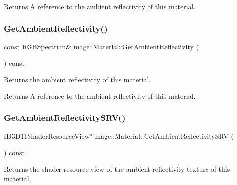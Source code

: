 \begin{DoxyReturn}{Returns}
A reference to the ambient reflectivity of this material. 
\end{DoxyReturn}
\hypertarget{structmage_1_1_material_ad13afcccbb9b73cddd23a8586e77136e}{}\label{structmage_1_1_material_ad13afcccbb9b73cddd23a8586e77136e} 
\subsubsection{\texorpdfstring{Get\+Ambient\+Reflectivity()}{GetAmbientReflectivity()}\hspace{0.1cm}{\footnotesize\ttfamily [2/2]}}
{\footnotesize\ttfamily const \hyperlink{structmage_1_1_r_g_b_spectrum}{R\+G\+B\+Spectrum}\& mage\+::\+Material\+::\+Get\+Ambient\+Reflectivity (\begin{DoxyParamCaption}{ }\end{DoxyParamCaption}) const\hspace{0.3cm}{\ttfamily [noexcept]}}

Returns the ambient reflectivity of this material.

\begin{DoxyReturn}{Returns}
A reference to the ambient reflectivity of this material. 
\end{DoxyReturn}
\hypertarget{structmage_1_1_material_ab0d0618400f2eb7cefecfa5c6da2192b}{}\label{structmage_1_1_material_ab0d0618400f2eb7cefecfa5c6da2192b} 
\subsubsection{\texorpdfstring{Get\+Ambient\+Reflectivity\+S\+R\+V()}{GetAmbientReflectivitySRV()}}
{\footnotesize\ttfamily I\+D3\+D11\+Shader\+Resource\+View$\ast$ mage\+::\+Material\+::\+Get\+Ambient\+Reflectivity\+S\+RV (\begin{DoxyParamCaption}{ }\end{DoxyParamCaption}) const\hspace{0.3cm}{\ttfamily [noexcept]}}

Returns the shader resource view of the ambient reflectivity texture of this material.

